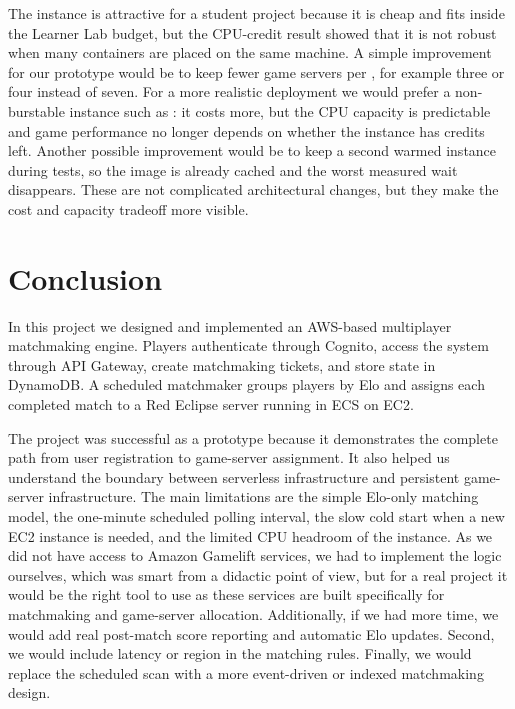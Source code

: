 \documentclass[9pt,a4paper,twocolumn,twoside]{tau-class/tau}
\begin{document}
    The  instance is attractive for a student project because it is cheap and fits inside the Learner Lab budget, but the CPU-credit result showed that it is not robust when many containers are placed on the same machine. A simple improvement for our prototype would be to keep fewer game servers per , for example three or four instead of seven. For a more realistic deployment we would prefer a non-burstable instance such as : it costs more, but the CPU capacity is predictable and game performance no longer depends on whether the instance has credits left. Another possible improvement would be to keep a second warmed instance during tests, so the image is already cached and the worst measured wait disappears. These are not complicated architectural changes, but they make the cost and capacity tradeoff more visible.
    
\section{Conclusion}

    In this project we designed and implemented an AWS-based multiplayer matchmaking engine. Players authenticate through Cognito, access the system through API Gateway, create matchmaking tickets, and store state in DynamoDB. A scheduled matchmaker groups players by Elo and assigns each completed match to a Red Eclipse server running in ECS on EC2.

    The project was successful as a prototype because it demonstrates the complete path from user registration to game-server assignment. It also helped us understand the boundary between serverless infrastructure and persistent game-server infrastructure. The main limitations are the simple Elo-only matching model, the one-minute scheduled polling interval, the slow cold start when a new EC2 instance is needed, and the limited CPU headroom of the  instance.
    As we did not have access to Amazon Gamelift services, we had to implement the logic ourselves, which was smart from a didactic point of view, but for a real project it would be the right tool to use as these services are built specifically for matchmaking and game-server allocation.
    Additionally, if we had more time, we would add real post-match score reporting and automatic Elo updates. Second, we would include latency or region in the matching rules. Finally, we would replace the scheduled scan with a more event-driven or indexed matchmaking design.


\printbibliography

\end{document}
